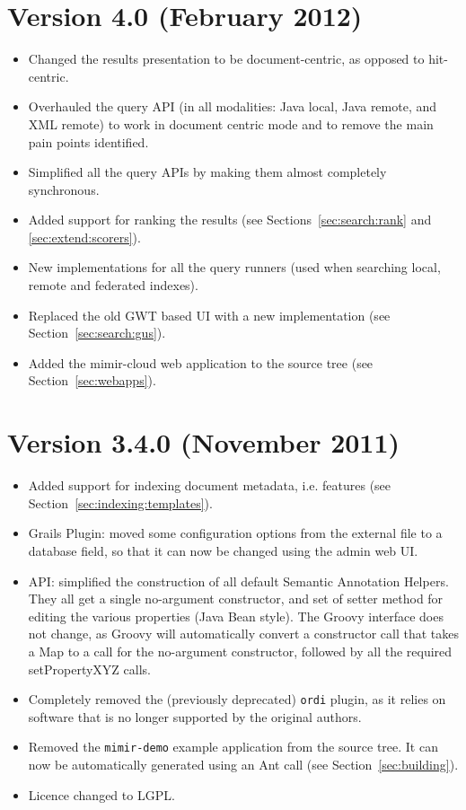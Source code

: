 \section{Version 4.0 (February 2012)}
\begin{itemize}
  \item Changed the results presentation to be document-centric, as opposed to
  hit-centric.
  \item Overhauled the query API (in all modalities: Java local, Java remote,
  and XML remote) to work in document centric mode and to remove the main pain
  points identified.
  \item Simplified all the query APIs by making them almost completely
  synchronous.
  \item Added support for ranking the results (see
  Sections~\ref{sec:search:rank}  and \ref{sec:extend:scorers}).
  \item New implementations for all the query runners (used when searching
  local, remote and federated indexes).
  \item Replaced the old GWT based UI with a new implementation (see
  Section~\ref{sec:search:gus}).
  \item Added the mimir-cloud web application to the source tree (see
  Section~\ref{sec:webapps}).
\end{itemize}

\section{Version 3.4.0 (November 2011)}

\begin{itemize}
\item Added support for indexing document metadata, i.e. features (see
Section~\ref{sec:indexing:templates}).
\item \Mimir{} Grails Plugin: moved some configuration options from the external
file to a database field, so that it can now be changed using the admin web UI.
\item API: simplified the construction of all default Semantic Annotation
Helpers. They all get a single no-argument constructor, and set of setter
method for editing the various properties (Java Bean style). The Groovy
interface does not change, as Groovy will automatically convert a constructor
call that takes a Map to a call for the no-argument constructor, followed by all
the required setPropertyXYZ calls.
\item Completely removed the (previously deprecated) {\tt ordi} plugin, as it
relies on software that is no longer supported by the original authors.
\item Removed the {\tt mimir-demo} example application from the source tree. It
can now be automatically generated using an Ant call (see 
Section~\ref{sec:building}).
\item Licence changed to LGPL.
 
\end{itemize}

